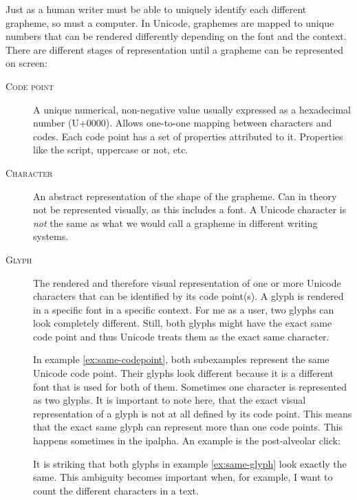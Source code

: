 Just as a human writer must be able to uniquely identify each different grapheme, so must a computer. In Unicode, graphemes are mapped to unique numbers that can be rendered differently depending on the font and the context. There are different stages of representation until a grapheme can be represented on screen:

\begin{description}
\item[\textsc{Code point}] A unique numerical, non-negative value usually expressed as a hexadecimal number (U+0000). Allows one-to-one mapping between characters and codes. Each code point has a set of properties attributed to it. Properties like the script, uppercase or not, etc.
\item[\textsc{Character}] An abstract representation of the shape of the grapheme. Can in theory not be represented visually, as this includes a font. A Unicode character is \textit{not} the same as what we would call a grapheme in different writing systems.
\item[\textsc{Glyph}] The rendered and therefore visual representation of one or more Unicode characters that can be identified by its code point(s). A glyph is rendered in a specific font in a specific context. For me as a user, two glyphs can look completely different. Still, both glyphs might have the exact same code point and thus Unicode treats them as the exact same character. 


In example \ref{ex:same-codepoint}, both subexamples represent the same Unicode code point. Their glyphs look different because it is a different font that is used for both of them.
Sometimes one character is represented as two glyphs. It is important to note here, that the exact visual representation of a glyph is not at all defined by its code point. This means that the exact same glyph can represent more than one code points. This happens sometimes in the \ac{ipalpha}. An example is the post-alveolar click:


It is striking that both glyphs in example \ref{ex:same-glyph} look exactly the same. This ambiguity becomes important when, for example, I want to count the different characters in a text.

\end{description}


